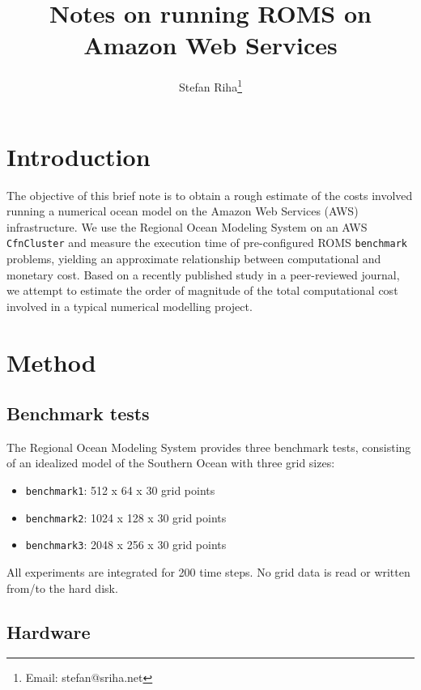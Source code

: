\documentclass[12pt,a4paper]{article}
\title{
	Notes on running ROMS on Amazon Web Services 
}
\author{Stefan Riha\thanks{Email: stefan@sriha.net}}
\begin{document}
	\setlength{\parindent}{0cm}
	\maketitle
	
\section{Introduction}

The objective of this brief note is to obtain a rough estimate of the costs involved running a numerical ocean model on the Amazon Web Services (AWS) infrastructure. We use the Regional Ocean Modeling System \citep[ROMS,][]{shchepetkin2005regional} on an AWS \verb|CfnCluster| and measure the execution time of pre-configured ROMS \verb|benchmark| problems, yielding an approximate relationship between computational and monetary cost. Based on a recently published study in a peer-reviewed journal, we attempt to estimate the order of magnitude of the total computational cost involved in a typical numerical modelling project.

\section{Method}

\subsection{Benchmark tests} 

The Regional Ocean Modeling System \citep[ROMS, see ][]{shchepetkin2005regional} provides three benchmark tests, consisting of 
an idealized model of the Southern Ocean with three grid sizes:

\begin{itemize}
	\item \verb|benchmark1|:   512 x 64 x 30 grid points
	\item \verb|benchmark2|:   1024 x 128 x 30 grid points
	\item \verb|benchmark3|:   2048 x 256 x 30 grid points
\end{itemize}

All experiments are integrated for 200 time steps. No grid data is read or written from/to the hard disk.

\subsection{Hardware}
\end{document}
